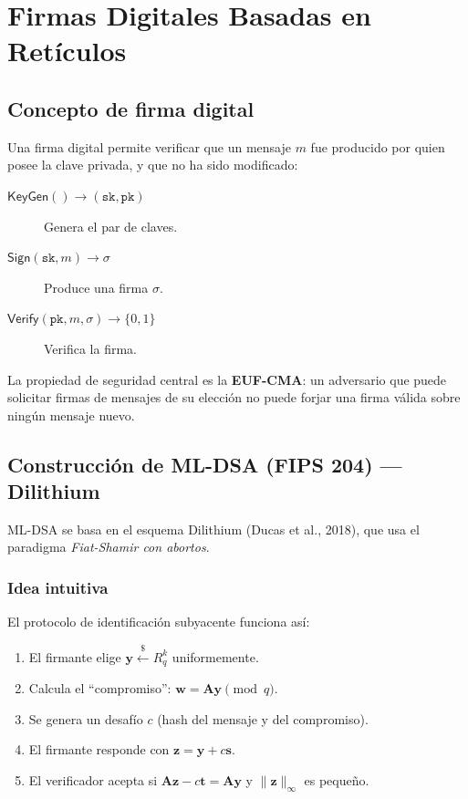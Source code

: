 \documentclass[12pt,a4paper,twoside,openright]{book}
\theoremstyle{plain}
\theoremstyle{definition}
\theoremstyle{remark}
\newcommand{\vv}[1]{\mathbf{#1}}
\newcommand{\mm}[1]{\mathbf{#1}}
\newcommand{\KeyGen}{\mathsf{KeyGen}}
\newcommand{\Sign}{\mathsf{Sign}}
\newcommand{\Verify}{\mathsf{Verify}}
\begin{document}
\chapter{Firmas Digitales Basadas en Ret\'iculos}
\label{chap:firmas}

\section{Concepto de firma digital}

Una firma digital permite verificar que un mensaje $m$ fue producido por
quien posee la clave privada, y que no ha sido modificado:

\begin{description}
  \item[$\KeyGen() \to (\mathtt{sk}, \mathtt{pk})$] Genera el par de claves.
  \item[$\Sign(\mathtt{sk}, m) \to \sigma$] Produce una firma $\sigma$.
  \item[$\Verify(\mathtt{pk}, m, \sigma) \to \{0,1\}$] Verifica la firma.
\end{description}

La propiedad de seguridad central es la \textbf{EUF-CMA}: un adversario que
puede solicitar firmas de mensajes de su elecci\'on no puede forjar una firma
v\'alida sobre ning\'un mensaje nuevo.

\section{Construcci\'on de ML-DSA (FIPS 204) --- Dilithium}

ML-DSA se basa en el esquema Dilithium (Ducas et al., 2018), que usa el
paradigma \emph{Fiat-Shamir con abortos}.

\subsection{Idea intuitiva}

El protocolo de identificaci\'on subyacente funciona as\'i:
\begin{enumerate}
  \item El firmante elige $\vv{y} \xleftarrow{\$} R_q^k$ uniformemente.
  \item Calcula el ``compromiso'': $\vv{w} = \mm{A}\vv{y} \pmod{q}$.
  \item Se genera un desaf\'io $c$ (hash del mensaje y del compromiso).
  \item El firmante responde con $\vv{z} = \vv{y} + c\vv{s}$.
  \item El verificador acepta si $\mm{A}\vv{z} - c\vv{t} = \mm{A}\vv{y}$
    y $\|\vv{z}\|_\infty$ es peque\~no.
\end{enumerate}
\end{document}
